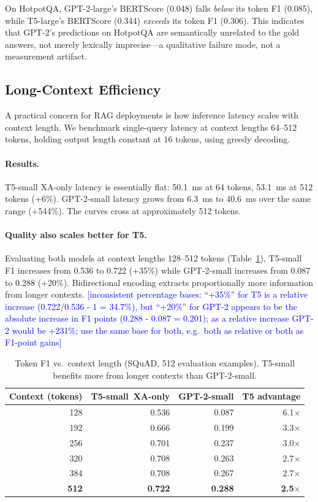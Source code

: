 \documentclass[11pt]{article}
\newcommand{\techcheck}[1]{\textcolor{blue}{[#1]}}
\newcommand{\tssmall}{T5-small\xspace}
\newcommand{\gptsmall}{GPT-2-small\xspace}
\newcommand{\xaonly}{XA-only\xspace}
\newcommand{\squad}{SQuAD\xspace}
\newcommand{\hotpotqa}{HotpotQA\xspace}
\begin{document}
On \hotpotqa, GPT-2-large's BERTScore (0.048) falls \emph{below} its token F1
(0.085), while T5-large's BERTScore (0.344) \emph{exceeds} its token F1 (0.306).
This indicates that GPT-2's predictions on \hotpotqa are semantically unrelated
to the gold answers, not merely lexically imprecise---a qualitative failure mode,
not a measurement artifact.

\subsection{Long-Context Efficiency}
\label{sec:latency}

A practical concern for RAG deployments is how inference latency scales with
context length.
We benchmark single-query latency at context lengths 64--512 tokens,
holding output length constant at 16 tokens, using greedy decoding.

\paragraph{Results.}
T5-small \xaonly latency is essentially flat: 50.1~ms at 64 tokens, 53.1~ms
at 512 tokens (+6\%).
GPT-2-small latency grows from 6.3~ms to 40.6~ms over the same range (+544\%).
The curves cross at approximately 512 tokens.

\paragraph{Quality also scales better for T5.}
Evaluating both models at context lengths 128--512 tokens
(Table~\ref{tab:context-quality}), T5-small F1 increases from 0.536 to 0.722
(+35\%) while GPT-2-small increases from 0.087 to 0.288 (+20\%).
Bidirectional encoding extracts proportionally more information from longer contexts.
\techcheck{inconsistent percentage bases: ``+35\%'' for T5 is a relative increase (0.722/0.536 - 1 = 34.7\%), but ``+20\%'' for GPT-2 appears to be the absolute increase in F1 points (0.288 - 0.087 = 0.201); as a relative increase GPT-2 would be +231\%; use the same base for both, e.g.\ both as relative or both as F1-point gains}

\begin{table}[t]
  \centering
  \small
  \caption{Token F1 vs.\ context length (\squad, 512 evaluation examples).
  T5-small benefits more from longer contexts than GPT-2-small.}
  \label{tab:context-quality}
  \begin{tabular}{rrrr}
    \toprule
    Context (tokens) & \tssmall~\xaonly & \gptsmall & T5 advantage \\
    \midrule
    128 & 0.536 & 0.087 & 6.1$\times$ \\
    192 & 0.666 & 0.199 & 3.3$\times$ \\
    256 & 0.701 & 0.237 & 3.0$\times$ \\
    320 & 0.708 & 0.263 & 2.7$\times$ \\
    384 & 0.708 & 0.267 & 2.7$\times$ \\
    \textbf{512} & \textbf{0.722} & \textbf{0.288} & \textbf{2.5$\times$} \\
    \bottomrule
  \end{tabular}
\end{table}
\end{document}
